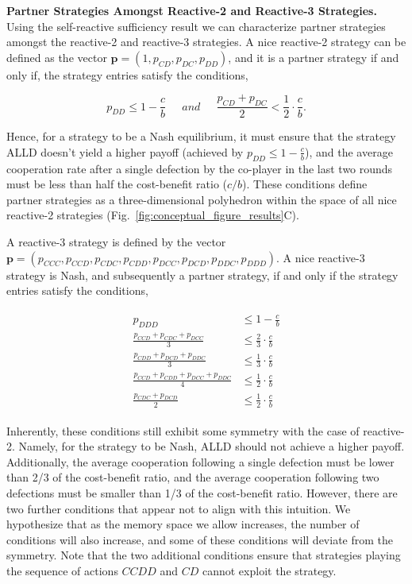 \documentclass{article}
\theoremstyle{definition}
\begin{document}
\textbf{Partner Strategies Amongst Reactive-2 and Reactive-3 Strategies.}
Using the self-reactive sufficiency result we can characterize partner
strategies amongst the reactive-2 and reactive-3 strategies. A nice reactive-2
strategy can be defined as the vector $\mathbf{p} = (1, p_{CD}, p_{DC},
p_{DD})$, and it is a partner strategy if and only if, the strategy entries
satisfy the conditions,

\begin{equation}\label{eq:two_bit_conditions}
  \displaystyle p_{DD} \leq 1\!-\! \frac{c}{b}  \quad ~~and~~ \quad \displaystyle \frac{p_{CD} + p_{DC}}{2} < \frac{1}{2} \cdot \frac{c}{b}.
\end{equation}

Hence, for a strategy to be a Nash equilibrium, it must ensure that the strategy
ALLD doesn't yield a higher payoff (achieved by $p_{DD} \leq 1 - \frac{c}{b}$),
and the average cooperation rate after a single defection by the co-player in
the last two rounds must be less than half the cost-benefit ratio ($c/b$). These
conditions define partner strategies as a three-dimensional polyhedron within
the space of all nice reactive-2 strategies
(Fig.~\ref{fig:conceptual_figure_results}C).

A reactive-3 strategy is defined by the vector $\mathbf{p} = (p_{CCC}, p_{CCD},
p_{CDC}, p_{CDD}, p_{DCC}, p_{DCD}, p_{DDC}, p_{DDD})$. A nice reactive-3
strategy is Nash, and subsequently a partner strategy, if and only if the
strategy entries satisfy the conditions,

\begin{align}\label{eq:three_bit_conditions}
  \begin{split}
  p_{DDD} & \leq 1\!-\! \frac{c}{b} \\
  \frac{p_{CCD} + p_{CDC} + p_{DCC}}{3} & \leq \frac{2}{3} \cdot \frac{c}{b} \\
  \frac{p_{CDD} + p_{DCD} + p_{DDC}}{3} & \leq \frac{1}{3} \cdot \frac{c}{b} \\
  \frac{p_{CCD} + p_{CDD} + p_{DCC} + p_{DDC}}{4}  & \leq \frac{1}{2} \cdot \frac{c}{b}  \\
  \frac{p_{CDC} + p_{DCD}}{2} & \leq \frac{1}{2} \cdot \frac{c}{b}
  \end{split}
\end{align}

Inherently, these conditions still exhibit some symmetry with the case of
reactive-2. Namely, for the strategy to be Nash, ALLD should not achieve a
higher payoff. Additionally, the average cooperation following a single
defection must be lower than 2/3 of the cost-benefit ratio, and the average
cooperation following two defections must be smaller than 1/3 of the
cost-benefit ratio. However, there are two further conditions that appear not to
align with this intuition. We hypothesize that as the memory space we allow
increases, the number of conditions will also increase, and some of these
conditions will deviate from the symmetry. Note that the two additional conditions ensure
that strategies playing the sequence of actions $CCDD$ and $CD$ cannot exploit the
strategy.
\end{document}
